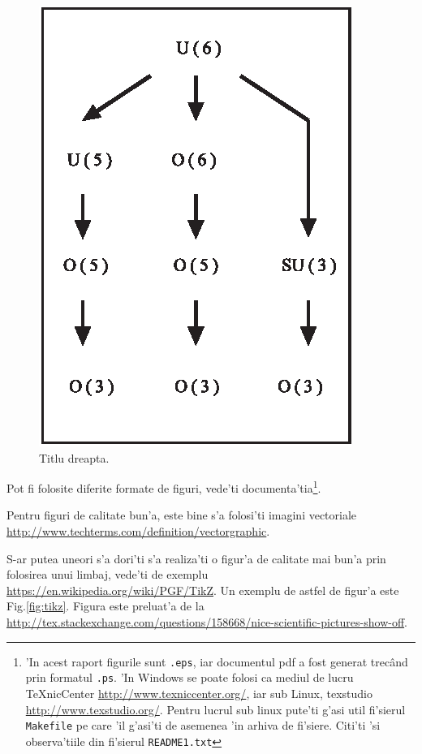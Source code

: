 \begin{figure}[ht]
\begin{minipage}{0.5\textwidth}
\includegraphics{tex_files/figs/authorfig1.eps}
\caption{Titlu dreapta.}
\label{fig:figura_exemplu4}       
\end{minipage}

\end{figure}

Pot fi folosite diferite formate de figuri, vede'ti documenta'tia\footnote{'In acest raport figurile sunt {\tt .eps}, iar documentul pdf a fost generat trec\^and prin formatul {\tt .ps}. 
'In Windows se poate folosi ca mediul de lucru TeXnicCenter 
\href{http://www.texniccenter.org/}{http://www.texniccenter.org/}, iar sub Linux, texstudio \href{http://www.texstudio.org/}{http://www.texstudio.org/}. 
Pentru lucrul sub linux pute'ti g'asi util fi'sierul {\tt Makefile} pe care 'il g'asi'ti de asemenea 'in arhiva de fi'siere. Citi'ti 'si observa'tiile din fi'sierul {\tt README1.txt}}.

Pentru figuri de calitate bun'a, este bine s'a folosi'ti imagini vectoriale \\ %
\href{http://www.techterms.com/definition/vectorgraphic}{http://www.techterms.com/definition/vectorgraphic}.

S-ar putea uneori s'a dori'ti s'a realiza'ti o figur'a de calitate mai bun'a prin folosirea unui limbaj, vede'ti de exemplu
\href{https://en.wikipedia.org/wiki/PGF/TikZ}{https://en.wikipedia.org/wiki/PGF/TikZ}.
Un exemplu de astfel de figur'a este 
Fig.\ref{fig:tikz}. Figura este preluat'a de la \\
\href{http://tex.stackexchange.com/questions/158668/nice-scientific-pictures-show-off}{http://tex.stackexchange.com/questions/158668/nice-scientific-pictures-show-off}.


